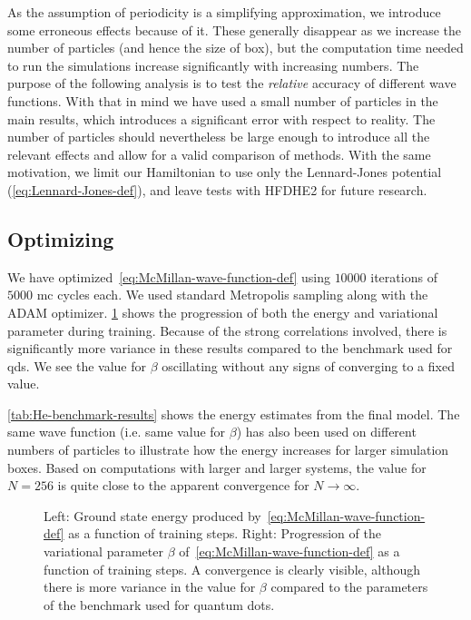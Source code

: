 \documentclass[Thesis.tex]{subfiles}
\begin{document}
\noindent As the assumption of periodicity is a simplifying approximation, we
introduce some erroneous effects because of it. These generally disappear as we
increase the number of particles (and hence the size of box), but the
computation time needed to run the simulations increase significantly with
increasing numbers. The purpose of the following analysis is to test the
\emph{relative} accuracy of different wave functions. With that in mind we have
used a small number of particles in the main results, which introduces a
significant error with respect to reality. The number of particles should nevertheless
be large enough to introduce all the relevant effects and allow for a valid
comparison of methods. With the same motivation, we limit our Hamiltonian to use
only the Lennard-Jones potential (\cref{eq:Lennard-Jones-def}), and leave tests
with HFDHE2 for future research.


\subsection{Optimizing}

We have optimized~\cref{eq:McMillan-wave-function-def} using $\num{10000}$
iterations of $\num{5000}$ \gls{mc} cycles each. We used standard Metropolis sampling
along with the ADAM optimizer. \cref{fig:He-benchmark-training} shows the
progression of both the energy and variational parameter during training.
Because of the strong correlations involved, there is significantly more
variance in these results compared to the benchmark used for \glspl{qd}. We
see the value for $\beta$ oscillating without any signs of converging to a
fixed value.

\cref{tab:He-benchmark-results} shows the energy estimates from the final model.
The same wave function (i.e. same value for $\beta$) has also been used on
different numbers of particles to illustrate how the energy increases for larger
simulation boxes. Based on computations with larger and larger systems, the
value for $N = 256$ is quite close to the apparent convergence for $N\to\infty$.

\begin{figure}[h]
  \centering
  \resizebox{\linewidth}{!}{%
    
  }
  \caption[Learning progression of McMillan wave function on $^4$He]{\label{fig:He-benchmark-training}Left: Ground state energy produced by~\cref{eq:McMillan-wave-function-def}
    as a function of training steps. Right: Progression of the variational
    parameter $\beta$ of~\cref{eq:McMillan-wave-function-def} as a function of
    training steps. A convergence is clearly visible, although there is more
    variance in the value for $\beta$ compared to the parameters of the
    benchmark used for quantum dots.}
\end{figure}
\end{document}
